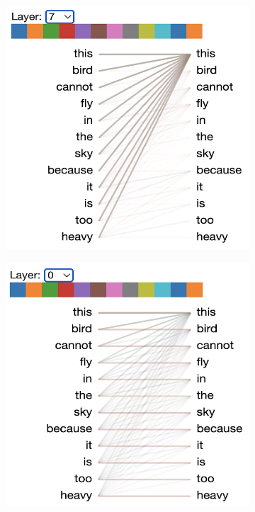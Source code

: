 \documentclass[]{article}
\begin{document}
\begin{figure}[!h]
    \centering
    \begin{subfigure}[b]{0.48\textwidth}
        \includegraphics[width=\textwidth]{FIGS/gpt2_head_l7.png}
    \end{subfigure}
    \hfill
    \begin{subfigure}[b]{0.48\textwidth}
        \includegraphics[width=\textwidth]{FIGS/gpt2_head_l0.png}

\end{subfigure}
\end{figure}
\end{document}
